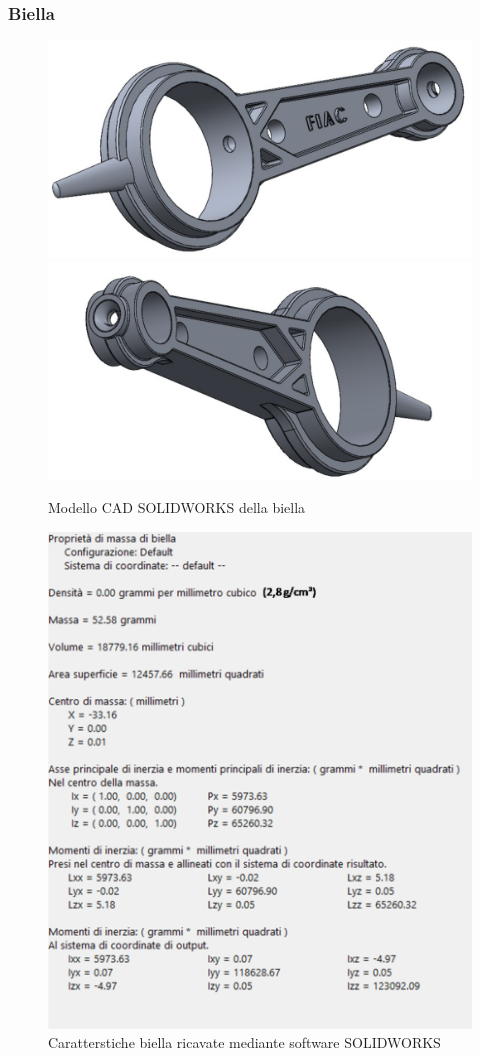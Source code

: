 \subsubsection{Biella}
\begin{figure}[h]
\centering
   {\includegraphics[width=.46\textwidth]{Immagini/Biella1.png}} \quad
   {\includegraphics[width=.49\textwidth]{Immagini/Biella2.png}}
\caption{Modello CAD SOLIDWORKS della biella}
\label{fig:Biella}
\end{figure}
\begin{figure}[h]
    \centering
    \includegraphics[scale=0.4]{Immagini/CaratteristicheBiella.png}
    \caption{Caratterstiche biella ricavate mediante software SOLIDWORKS}
    \label{fig:CaratteristicheBiella}
\end{figure}
\newpage

